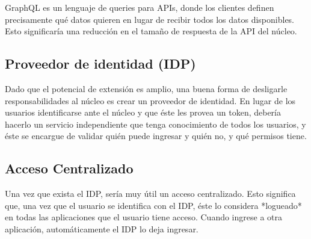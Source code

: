 GraphQL es un lenguaje de queries para APIs, donde los clientes definen precisamente qué datos quieren en lugar de recibir todos los datos disponibles. Esto significaría una reducción en el tamaño de respuesta de la API del núcleo.

\subsection[Proveedor de identidad (IDP)]{Proveedor de identidad (IDP)}

Dado que el potencial de extensión es amplio, una buena forma de desligarle responsabilidades al núcleo es crear un proveedor de identidad. En lugar de los usuarios identificarse ante el núcleo y que éste les provea un token, debería hacerlo un servicio independiente que tenga conocimiento de todos los usuarios, y éste se encargue de validar quién puede ingresar y quién no, y qué permisos tiene.

\subsection[Acceso Centralizado]{Acceso Centralizado}

Una vez que exista el IDP, sería muy útil un acceso centralizado. Esto significa que, una vez que el usuario se identifica con el IDP, éste lo considera *logueado* en todas las aplicaciones que el usuario tiene acceso. Cuando ingrese a otra aplicación, automáticamente el IDP lo deja ingresar.




